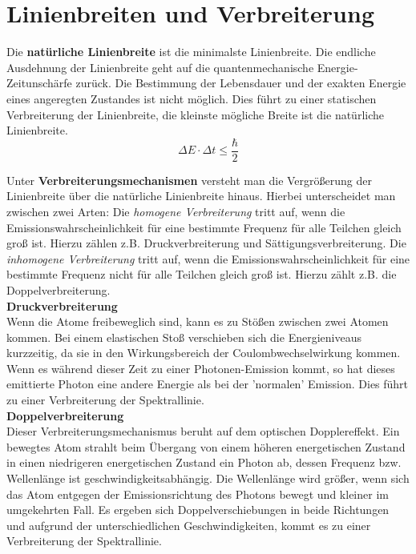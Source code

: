 \section{Linienbreiten und Verbreiterung}
Die \textbf{natürliche Linienbreite} ist die minimalste Linienbreite.
Die endliche Ausdehnung der Linienbreite geht auf die quantenmechanische Energie-Zeitunschärfe zurück.
Die Bestimmung der Lebensdauer und der exakten Energie eines 
angeregten Zustandes ist nicht möglich. 
Dies führt zu einer statischen Verbreiterung der Linienbreite, die kleinste mögliche Breite ist die natürliche Linienbreite.\\
\begin{equation}
    \Delta E \cdot \Delta t \leq \frac{\hbar}{2}
\end{equation}

Unter \textbf{Verbreiterungsmechanismen} versteht man die Vergrößerung der Linienbreite
über die natürliche Linienbreite hinaus. Hierbei unterscheidet man zwischen zwei Arten:
Die \textit{homogene Verbreiterung} tritt auf, wenn die Emissionswahrscheinlichkeit für eine bestimmte Frequenz 
für alle Teilchen gleich groß ist. Hierzu zählen z.B. Druckverbreiterung und Sättigungsverbreiterung. 
Die \textit{inhomogene Verbreiterung} tritt auf, wenn die Emissionswahrscheinlichkeit für eine bestimmte Frequenz 
nicht für alle Teilchen gleich groß ist. Hierzu zählt z.B. die Doppelverbreiterung.\\

\textbf{Druckverbreiterung}\\
Wenn die Atome freibeweglich sind, kann es zu Stößen zwischen zwei Atomen kommen. Bei einem elastischen Stoß verschieben sich die Energieniveaus kurzzeitig, da sie in den Wirkungsbereich der Coulombwechselwirkung kommen. Wenn es während dieser Zeit zu einer Photonen-Emission kommt, so hat dieses emittierte Photon eine andere Energie als bei der 'normalen' Emission.
Dies führt zu einer Verbreiterung der Spektrallinie.\\

\textbf{Doppelverbreiterung} \\
Dieser Verbreiterungsmechanismus beruht auf dem optischen Dopplereffekt.
Ein bewegtes Atom strahlt beim Übergang von einem höheren energetischen Zustand in einen niedrigeren energetischen Zustand ein Photon ab, dessen Frequenz bzw. Wellenlänge ist geschwindigkeitsabhängig. Die Wellenlänge wird größer, wenn sich das Atom entgegen der Emissionsrichtung des Photons bewegt und kleiner im umgekehrten Fall. 
Es ergeben sich Doppelverschiebungen in beide Richtungen und aufgrund der unterschiedlichen Geschwindigkeiten, kommt es zu einer Verbreiterung der Spektrallinie. \citep[vgl.][]{linienbreite}
